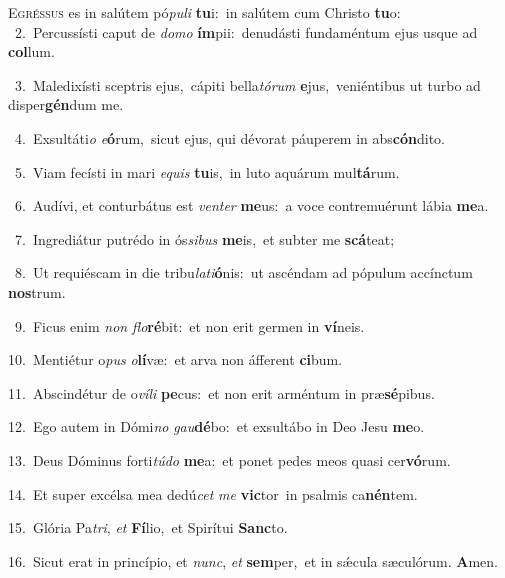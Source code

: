 \lettrine{\initial\textcolor{\initialcolor}{E}}{gréssus} es in salútem pó\-\textit{pu}\-\textit{li} \textbf{tu}\-i:~\star in salútem cum Christo \textbf{tu}\-o:\\
{\numbfont\textcolor{\numbcolor}{~2.}}~Percussísti caput de \textit{do}\-\textit{mo} \textbf{ím}\-pii:~\star denudásti fundaméntum ejus usque ad \textbf{col}\-lum.\par
{\numbfont\textcolor{\numbcolor}{~3.}}~Maledixísti sceptris ejus,~\dagger cápiti bella\-\textit{tó}\-\textit{rum} \textbf{e}\-jus,~\star veniéntibus ut turbo ad disper\-\textbf{gén}\-dum me.\par
{\numbfont\textcolor{\numbcolor}{~4.}}~Exsultáti\textit{o} \textit{e}\-\textbf{ó}rum,~\star sicut ejus, qui dévorat páuperem in abs\-\textbf{cón}\-dito.\par
{\numbfont\textcolor{\numbcolor}{~5.}}~Viam fecísti in mari \textit{e}\-\textit{quis} \textbf{tu}\-is,~\star in luto aquárum mul\-\textbf{tá}\-rum.\par
{\numbfont\textcolor{\numbcolor}{~6.}}~Audívi, et conturbátus est \textit{ven}\-\textit{ter} \textbf{me}\-us:~\star a voce contremuérunt lábia \textbf{me}\-a.\par
{\numbfont\textcolor{\numbcolor}{~7.}}~Ingrediátur putrédo in ós\-\textit{si}\-\textit{bus} \textbf{me}\-is,~\star et subter me \textbf{scá}\-teat;\par
{\numbfont\textcolor{\numbcolor}{~8.}}~Ut requiéscam in die tribu\-\textit{la}\-\textit{ti}\textbf{ó}nis:~\star ut ascéndam ad pópulum accínctum \textbf{nos}\-trum.\par
{\numbfont\textcolor{\numbcolor}{~9.}}~Ficus enim \textit{non} \textit{flo}\-\textbf{ré}bit:~\star et non erit germen in \textbf{ví}\-neis.\par
{\numbfont\textcolor{\numbcolor}{10.}}~Mentiétur o\textit{pus} \textit{o}\-\textbf{lí}væ:~\star et arva non áfferent \textbf{ci}\-bum.\par
{\numbfont\textcolor{\numbcolor}{11.}}~Abscindétur de o\-\textit{ví}\-\textit{li} \textbf{pe}\-cus:~\star et non erit arméntum in præ\-\textbf{sé}\-pibus.\par
{\numbfont\textcolor{\numbcolor}{12.}}~Ego autem in Dómi\textit{no} \textit{gau}\-\textbf{dé}bo:~\star et exsultábo in Deo Jesu \textbf{me}\-o.\par
{\numbfont\textcolor{\numbcolor}{13.}}~Deus Dóminus forti\-\textit{tú}\-\textit{do} \textbf{me}\-a:~\star et ponet pedes meos quasi cer\-\textbf{vó}\-rum.\par
{\numbfont\textcolor{\numbcolor}{14.}}~Et super excélsa mea dedú\textit{cet} \textit{me} \textbf{vic}\-tor~\star in psalmis ca\-\textbf{nén}\-tem.\par
{\numbfont\textcolor{\numbcolor}{15.}}~Glória Pa\-\textit{tri}\-, \textit{et} \textbf{Fí}\-lio,~\star et Spirítui \textbf{Sanc}\-to.\par
{\numbfont\textcolor{\numbcolor}{16.}}~Sicut erat in princípio, et \textit{nunc}\-, \textit{et} \textbf{sem}\-per,~\star et in sǽcula sæculórum. \textbf{A}\-men.\par

